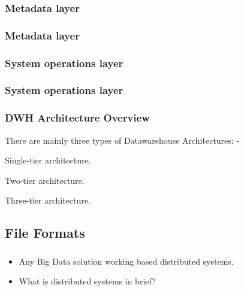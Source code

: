 \subsubsection{Metadata layer}

\begin{frame}
    \frametitle{Metadata layer}
\end{frame}

\subsubsection{System operations layer}

\begin{frame}
    \frametitle{System operations layer}
\end{frame}



\begin{frame}
    \frametitle{DWH Architecture Overview}
    There are mainly three types of Datawarehouse Architectures: -
    \begin{wideitemize}
        \item Single-tier architecture.
        \item Two-tier architecture.
        \item Three-tier architecture.
    \end{wideitemize}

\end{frame}


\subsection{File Formats}

\begin{frame}
    \frametitle{\subsecname}
    \begin{itemize}[<+->]
        \item Any Big Data solution working based distributed systems.
        \item What is distributed systems in brief?
    \end{itemize}
\end{frame}
